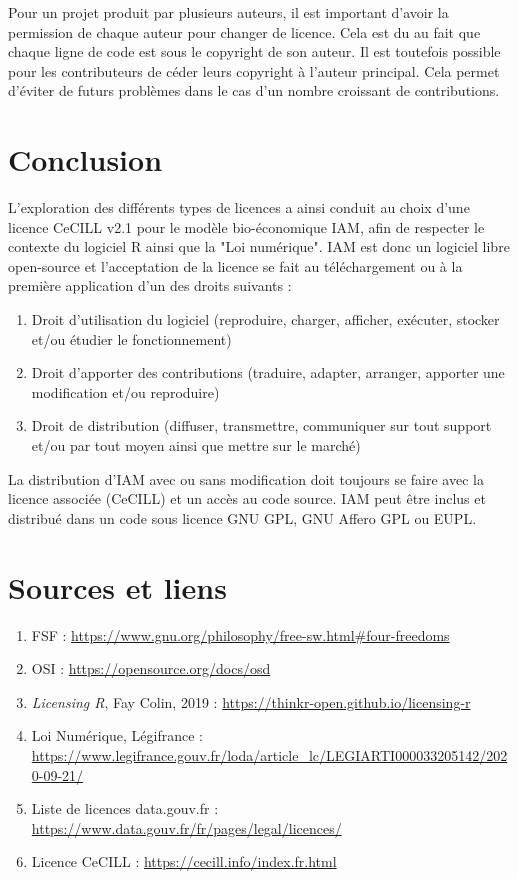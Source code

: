 \documentclass[12pt, colorinlistoftodos]{article}
\begin{document}
Pour un projet produit par plusieurs auteurs, il est important
d'avoir la permission de chaque auteur pour changer de licence.
Cela est du au fait que chaque ligne de code est sous le copyright de son auteur.
Il est toutefois possible pour les contributeurs de céder leurs copyright à l'auteur principal.
Cela permet d'éviter de futurs problèmes dans le cas d'un nombre croissant de contributions.

\newpage

\section{Conclusion}

L'exploration des différents types de licences a ainsi conduit au choix d'une licence CeCILL v2.1 pour le modèle bio-économique IAM, 
afin de respecter le contexte du logiciel R ainsi que la "Loi numérique".
IAM est donc un logiciel libre open-source et l'acceptation de la licence se fait au téléchargement ou à la première application d'un des droits suivants :
\begin{enumerate}
    \item Droit d'utilisation du logiciel (reproduire, charger, afficher, exécuter, stocker et/ou étudier le fonctionnement)
    \item Droit d'apporter des contributions (traduire, adapter, arranger, apporter une modification et/ou reproduire)
    \item Droit de distribution (diffuser, transmettre, communiquer sur tout support et/ou par tout moyen ainsi que mettre sur le marché)
\end{enumerate}
La distribution d'IAM avec ou sans modification doit toujours se faire avec la licence associée (CeCILL) et un accès au code source.
IAM peut être inclus et distribué dans un code sous licence GNU GPL, GNU Affero GPL ou EUPL. 

\section{Sources et liens}

\begin{enumerate}
    \item FSF : \url{https://www.gnu.org/philosophy/free-sw.html#four-freedoms}
    \item OSI : \url{https://opensource.org/docs/osd}
    \item \textit{Licensing R}, Fay Colin, 2019 : \url{https://thinkr-open.github.io/licensing-r}
    \item Loi Numérique, Légifrance : \url{https://www.legifrance.gouv.fr/loda/article_lc/LEGIARTI000033205142/2020-09-21/}
    \item Liste de licences data.gouv.fr : \url{https://www.data.gouv.fr/fr/pages/legal/licences/}
    \item Licence CeCILL : \url{https://cecill.info/index.fr.html}
\end{enumerate}
\end{document}
